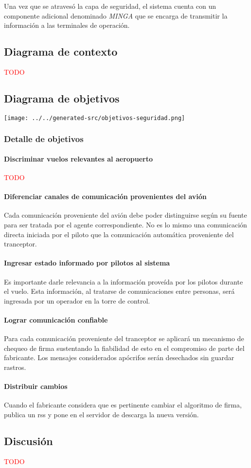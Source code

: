 Una vez que se atravesó la capa de seguridad, el sistema cuenta con un componente adicional denominado \emph{MINGA} que se encarga de transmitir la información a las terminales de operación.

\subsection{Diagrama de contexto}
\textcolor{red}{TODO}

\subsection{Diagrama de objetivos}
\texttt{[image: ../../generated-src/objetivos-seguridad.png]}

\subsubsection{Detalle de objetivos}
\paragraph{Discriminar vuelos relevantes al aeropuerto}
\textcolor{red}{TODO}
\paragraph{Diferenciar canales de comunicación provenientes del avión}
Cada comunicación proveniente del avión debe poder distinguirse según su fuente para ser tratada por el agente correspondiente. No es lo mismo una comunicación directa iniciada por el piloto que la comunicación automática proveniente del tranceptor.
\paragraph{Ingresar estado informado por pilotos al sistema}
Es importante darle relevancia a la información proveída por los pilotos durante el vuelo. Esta información, al tratarse de comunicaciones entre personas, será ingresada por un operador en la torre de control.
\paragraph{Lograr comunicación confiable}
Para cada comunicación proveniente del tranceptor se aplicará un mecanismo de chequeo de firma sustentando la fiabilidad de esto en el compromiso de parte del fabricante. Los mensajes considerados apócrifos serán desechados sin guardar rastros.
\paragraph{Distribuir cambios}
Cuando el fabricante considera que es pertinente cambiar el algoritmo de firma, publica un rss y pone en el servidor de descarga la nueva versión.

\subsection{Discusión}
\textcolor{red}{TODO}
